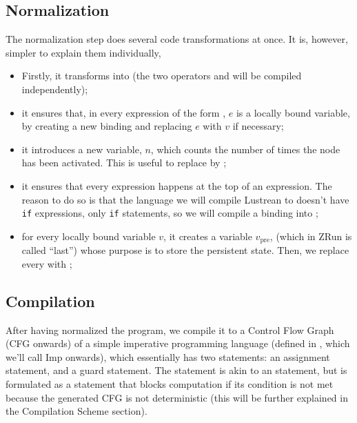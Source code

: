 \documentclass{scrartcl}
\begin{document}
\subsection{Normalization}
The normalization step does several code transformations at once.  It is, however, simpler to
explain them individually,
\begin{itemize}
\item Firstly, it transforms  into
   (the two operators \lustr{->} and  will be
  compiled independently);
\item it ensures that, in every expression of the form , $e$ is a locally
  bound variable, by creating a new binding  and replacing $e$ with $v$ if
  necessary;
\item it introduces a new variable, $n$, which counts the number of times the node has been
  activated.  This is useful to replace  by
  ;
\item it ensures that every  expression happens at the 
  top of an expression.  The reason to do so is that the language we will compile Lustrean to
  doesn't have \texttt{if} expressions, only \texttt{if} statements, so we will compile a
  binding  into
  ;

\item for every locally bound variable \(v\), it creates a variable \(v_\textrm{pre}\), (which in
  ZRun is called ``last'') whose purpose is to store the persistent state.  Then, we replace
  every  with ;
\end{itemize}

\subsection{Compilation}
After having normalized the program, we compile it to a Control Flow Graph (CFG onwards) of a
simple imperative programming language (defined in , which we'll call Imp
onwards), which essentially has two statements: an assignment statement, and a guard statement.
The  statement is akin to an  statement, but is formulated as a
  statement that blocks computation if its condition is not met because the generated CFG is not
  deterministic (this will be further explained in the Compilation Scheme section).
\end{document}
